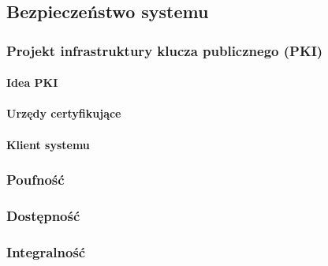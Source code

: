 \newpage
\subsection{Bezpieczeństwo systemu}\label{sec:Projekt bezpieczeństwo}
	\subsubsection{Projekt infrastruktury klucza publicznego (PKI)}\label{sec:Projekt PKI}
		\paragraph*{Idea PKI}
		\paragraph*{Urzędy certyfikujące}
		\paragraph{Klient systemu}
	\subsubsection{Poufność}
	\subsubsection{Dostępność}
	\subsubsection{Integralność}
